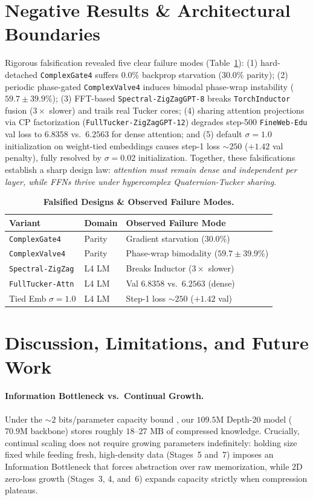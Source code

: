 \documentclass[10pt,twocolumn]{article}
\newcommand{\toprule}{\hline\hline}
\newcommand{\midrule}{\hline}
\newcommand{\bottomrule}{\hline\hline}
\newcommand{\citep}[1]{\cite{#1}}
\begin{document}
\section{Negative Results \& Architectural Boundaries}
Rigorous falsification revealed five clear failure modes (Table~\ref{tab:neg}): (1) hard-detached \texttt{ComplexGate4} suffers $0.0\%$ backprop starvation ($30.0\%$ parity); (2) periodic phase-gated \texttt{ComplexValve4} induces bimodal phase-wrap instability ($59.7 \pm 39.9\%$); (3) FFT-based \texttt{Spectral-ZigZagGPT-8} breaks \texttt{TorchInductor} fusion ($3\times$ slower) and trails real Tucker cores; (4) sharing attention projections via CP factorization (\texttt{FullTucker-ZigZagGPT-12}) degrades step-500 \texttt{FineWeb-Edu} val loss to $6.8358$ vs.\ $6.2563$ for dense attention; and (5) default $\sigma=1.0$ initialization on weight-tied embeddings causes step-1 loss $\sim 250$ ($+1.42$ val penalty), fully resolved by $\sigma=0.02$ initialization. Together, these falsifications establish a sharp design law: \emph{attention must remain dense and independent per layer, while FFNs thrive under hypercomplex Quaternion-Tucker sharing}.

\begin{table}[h!]
\centering
\caption{\textbf{Falsified Designs \& Observed Failure Modes.}}
\label{tab:neg}
\scriptsize
\setlength{\tabcolsep}{2.4pt}
\begin{tabular}{lll}
\toprule
\textbf{Variant} & \textbf{Domain} & \textbf{Observed Failure Mode} \\
\midrule
\texttt{ComplexGate4} & Parity & Gradient starvation ($30.0\%$) \\
\texttt{ComplexValve4} & Parity & Phase-wrap bimodality ($59.7\pm 39.9\%$) \\
\texttt{Spectral-ZigZag} & L4 LM & Breaks Inductor ($3\times$ slower) \\
\texttt{FullTucker-Attn} & L4 LM & Val $6.8358$ vs.\ $6.2563$ (dense) \\
Tied Emb $\sigma=1.0$ & L4 LM & Step-1 loss $\sim 250$ ($+1.42$ val) \\
\bottomrule
\end{tabular}
\end{table}

\section{Discussion, Limitations, and Future Work}
\paragraph{Information Bottleneck vs.\ Continual Growth.} Under the $\sim 2$ bits/parameter capacity bound \citep{allenzhu2024physics}, our $109.5\text{M}$ Depth-20 model ($70.9\text{M}$ backbone) stores roughly $18$--$27\text{ MB}$ of compressed knowledge. Crucially, continual scaling does not require growing parameters indefinitely: holding size fixed while feeding fresh, high-density data (Stages~5 and~7) imposes an Information Bottleneck \citep{tishby2015deep} that forces abstraction over raw memorization, while 2D zero-loss growth (Stages~3, 4, and~6) expands capacity strictly when compression plateaus.
\end{document}
